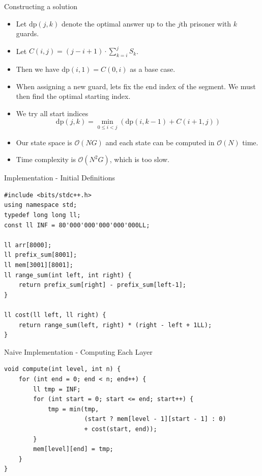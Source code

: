 \documentclass{beamer}
\begin{document}
\begin{frame}[plain]{Constructing a solution}
    \begin{itemize}
        \item<1-> Let $\mathrm{dp}(j, k)$ denote the optimal answer up to the $j$th prisoner with $k$ guards.
        \item<2-> Let $C(i, j) = (j-i+1) \cdot \sum_{k=i}^{j} S_k$.
        \item<3-> Then we have $\mathrm{dp}(i, 1) = C(0, i)$ as a base case.
        \item<4-> When assigning a new guard, lets fix the end index of the segment. We must then find the optimal starting index.
        \item<5-> We try all start indices
            \[
                \mathrm{dp}(j, k) = \min_{0 \leq i < j}\left( \mathrm{dp}(i, k-1) + C(i + 1, j) \right)
            \]
        \item<6-> Our state space is $\mathcal{O}(NG)$ and each state can be computed in $\mathcal{O}(N)$ time.
        \item<7-> Time complexity is $\mathcal{O}(N^2G)$, which is too slow.
    \end{itemize}
\end{frame}

\begin{frame}{Implementation - Initial Definitions}
    \begin{scriptsize}
        \begin{verbatim}           
#include <bits/stdc++.h>
using namespace std;
typedef long long ll;
const ll INF = 80'000'000'000'000'000LL;

ll arr[8000];
ll prefix_sum[8001];
ll mem[3001][8001];
ll range_sum(int left, int right) {
    return prefix_sum[right] - prefix_sum[left-1];
}

ll cost(ll left, ll right) {
    return range_sum(left, right) * (right - left + 1LL);
}
        \end{verbatim}
    \end{scriptsize}
\end{frame}

\begin{frame}{Naive Implementation - Computing Each Layer}
    \begin{scriptsize}
        \begin{verbatim}           
void compute(int level, int n) {
    for (int end = 0; end < n; end++) {
        ll tmp = INF;
        for (int start = 0; start <= end; start++) {
            tmp = min(tmp,
                      (start ? mem[level - 1][start - 1] : 0)
                      + cost(start, end));
        }
        mem[level][end] = tmp;
    }
}
        \end{verbatim}
    \end{scriptsize}
\end{frame}
\end{document}
